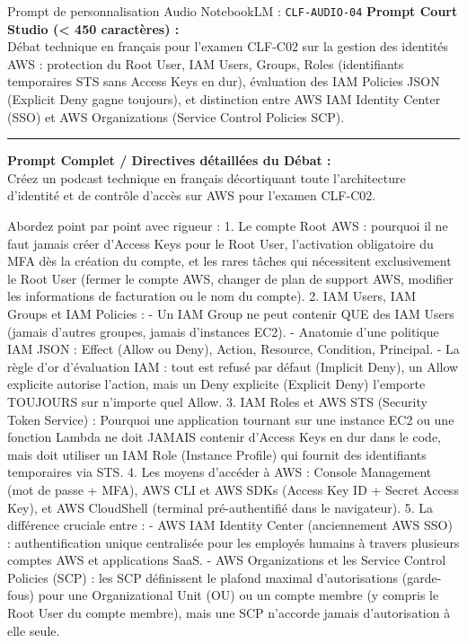\documentclass[11pt,a4paper]{article}
\begin{document}
\begin{promptbox}{Prompt de personnalisation Audio NotebookLM : \texttt{CLF-AUDIO-04}}
\textbf{Prompt Court Studio (< 450 caractères) :}\\
Débat technique en français pour l'examen CLF-C02 sur la gestion des identités AWS : protection du Root User, IAM Users, Groups, Roles (identifiants temporaires STS sans Access Keys en dur), évaluation des IAM Policies JSON (Explicit Deny gagne toujours), et distinction entre AWS IAM Identity Center (SSO) et AWS Organizations (Service Control Policies SCP).

\medskip\hrule\medskip
\textbf{Prompt Complet / Directives détaillées du Débat :}\\
Créez un podcast technique en français décortiquant toute l'architecture d'identité et de contrôle d'accès sur AWS pour l'examen CLF-C02.

Abordez point par point avec rigueur :
1. Le compte Root AWS : pourquoi il ne faut jamais créer d'Access Keys pour le Root User, l'activation obligatoire du MFA dès la création du compte, et les rares tâches qui nécessitent exclusivement le Root User (fermer le compte AWS, changer de plan de support AWS, modifier les informations de facturation ou le nom du compte).
2. IAM Users, IAM Groups et IAM Policies :
- Un IAM Group ne peut contenir QUE des IAM Users (jamais d'autres groupes, jamais d'instances EC2).
- Anatomie d'une politique IAM JSON : Effect (Allow ou Deny), Action, Resource, Condition, Principal.
- La règle d'or d'évaluation IAM : tout est refusé par défaut (Implicit Deny), un Allow explicite autorise l'action, mais un Deny explicite (Explicit Deny) l'emporte TOUJOURS sur n'importe quel Allow.
3. IAM Roles et AWS STS (Security Token Service) :
Pourquoi une application tournant sur une instance EC2 ou une fonction Lambda ne doit JAMAIS contenir d'Access Keys en dur dans le code, mais doit utiliser un IAM Role (Instance Profile) qui fournit des identifiants temporaires via STS.
4. Les moyens d'accéder à AWS : Console Management (mot de passe + MFA), AWS CLI et AWS SDKs (Access Key ID + Secret Access Key), et AWS CloudShell (terminal pré-authentifié dans le navigateur).
5. La différence cruciale entre :
- AWS IAM Identity Center (anciennement AWS SSO) : authentification unique centralisée pour les employés humains à travers plusieurs comptes AWS et applications SaaS.
- AWS Organizations et les Service Control Policies (SCP) : les SCP définissent le plafond maximal d'autorisations (garde-fous) pour une Organizational Unit (OU) ou un compte membre (y compris le Root User du compte membre), mais une SCP n'accorde jamais d'autorisation à elle seule.
\end{promptbox}
\end{document}
